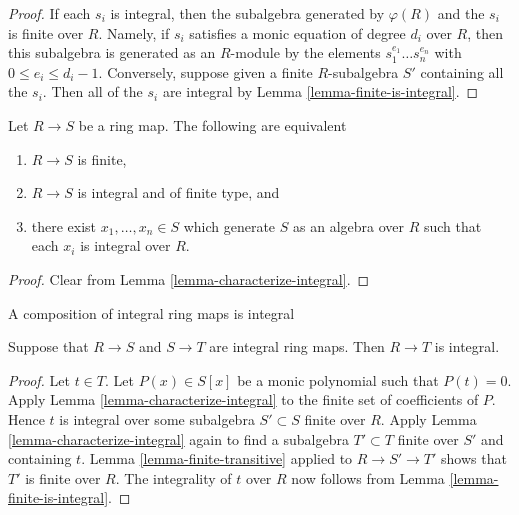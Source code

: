 \begin{proof}
If each $s_i$ is integral, then the subalgebra
generated by $\varphi(R)$ and the $s_i$ is finite
over $R$. Namely, if $s_i$ satisfies a monic equation
of degree $d_i$ over $R$, then this subalgebra is generated as an
$R$-module by the elements $s_1^{e_1} \ldots s_n^{e_n}$
with $0 \leq e_i \leq d_i - 1$.
Conversely, suppose given a finite $R$-subalgebra
$S'$ containing all the $s_i$. Then all of the
$s_i$ are integral by Lemma \ref{lemma-finite-is-integral}.
\end{proof}

\begin{lemma}
\label{lemma-characterize-finite-in-terms-of-integral}
Let $R \to S$ be a ring map. The following are equivalent
\begin{enumerate}
\item $R \to S$ is finite,
\item $R \to S$ is integral and of finite type, and
\item there exist $x_1, \ldots, x_n \in S$ which generate $S$ as an
algebra over $R$ such that each $x_i$ is integral over $R$.
\end{enumerate}
\end{lemma}

\begin{proof}
Clear from Lemma \ref{lemma-characterize-integral}.
\end{proof}

\begin{lemma}
\label{lemma-integral-transitive}
\begin{slogan}
A composition of integral ring maps is integral
\end{slogan}
Suppose that $R \to S$ and $S \to T$ are integral
ring maps. Then $R \to T$ is integral.
\end{lemma}

\begin{proof}
Let $t \in T$. Let $P(x) \in S[x]$ be a
monic polynomial such that $P(t) = 0$.
Apply Lemma \ref{lemma-characterize-integral}
to the finite set of coefficients of $P$.
Hence $t$ is integral over some subalgebra
$S' \subset S$ finite over $R$. Apply Lemma
\ref{lemma-characterize-integral} again to find
a subalgebra $T' \subset T$ finite over $S'$ and
containing $t$. Lemma \ref{lemma-finite-transitive}
applied to $R \to S' \to T'$ shows that $T'$ is finite
over $R$. The integrality of $t$ over $R$
now follows from Lemma \ref{lemma-finite-is-integral}.
\end{proof}

